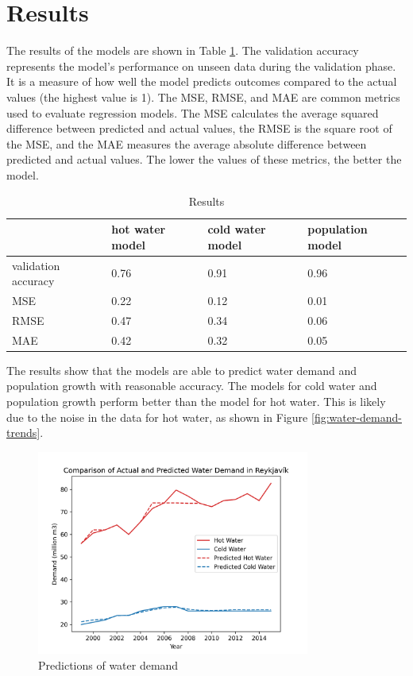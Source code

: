 \documentclass{article}
\begin{document}
\section{Results}
The results of the models are shown in Table \ref{tab:results}. The validation accuracy represents the model's performance on unseen data during the validation phase. It is a measure of how well the model predicts outcomes compared to the actual values (the highest value is 1). The MSE, RMSE, and MAE are common metrics used to evaluate regression models. The MSE calculates the average squared difference between predicted and actual values, the RMSE is the square root of the MSE, and the MAE measures the average absolute difference between predicted and actual values. The lower the values of these metrics, the better the model.

\begin{table}[!ht]
    \centering
    \begin{tabular}{llll}
        \hline
        ~                   & hot water model & cold water model & population model \\ \hline
        validation accuracy & 0.76            & 0.91             & 0.96             \\
        MSE                 & 0.22            & 0.12             & 0.01             \\
        RMSE                & 0.47            & 0.34             & 0.06             \\
        MAE                 & 0.42            & 0.32             & 0.05             \\ \hline
    \end{tabular}
    \caption{Results}
    \label{tab:results}
\end{table}

The results show that the models are able to predict water demand and population growth with reasonable accuracy. The models for cold water and population growth perform better than the model for hot water. This is likely due to the noise in the data for hot water, as shown in Figure \ref{fig:water-demand-trends}.

\begin{figure}[!ht]
    \centering
    \includegraphics[width=0.8\textwidth]{../figures/comparision-of-actual-and-predicted-water-demand.png}
    \caption{Predictions of water demand}
    \label{fig:water-demand-predictions}
\end{figure}
\end{document}

